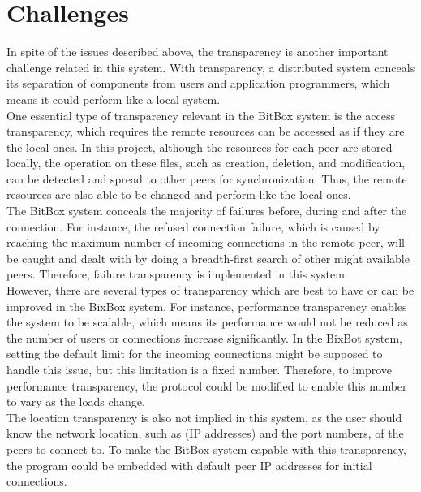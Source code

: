 \documentclass[a4paper,10pt,titlepage,twocolumn]{article}
\begin{document}
    \section*{Challenges}
    In spite of the issues described above, the transparency is another important challenge related in this system. With transparency, a distributed system conceals its separation of components from users and application programmers, which means it could perform like a local system.
    \\One essential type of transparency relevant in the BitBox system is the access transparency, which requires the remote resources can be accessed as if they are the local ones. In this project, although the resources for each peer are stored locally, the operation on these files, such as creation, deletion, and modification, can be detected and spread to other peers for synchronization. Thus, the remote resources are also able to be changed and perform like the local ones.
    \\The BitBox system conceals the majority of failures before, during and after the connection. For instance, the refused connection failure, which is caused by reaching the maximum number of incoming connections in the remote peer, will be caught and dealt with by doing a breadth-first search of other might available peers. Therefore, failure transparency is implemented in this system.
    \\However, there are several types of transparency which are best to have or can be improved in the BixBox system. For instance, performance transparency enables the system to be scalable, which means its performance would not be reduced as the number of users or connections increase significantly. In the BixBot system, setting the default limit for the incoming connections might be supposed to handle this issue, but this limitation is a fixed number. Therefore, to improve performance transparency, the protocol could be modified to enable this number to vary as the loads change.
    \\The location transparency is also not implied in this system, as the user should know the network location, such as   (IP addresses) and the port numbers, of the peers to connect to. To make the BitBox system capable with this transparency, the program could be embedded with default peer IP addresses for initial connections.
\end{document}

